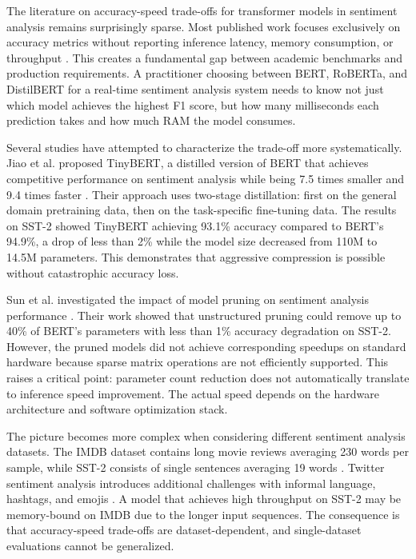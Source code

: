 \documentclass[conference]{IEEEtran}
\begin{document}
The literature on accuracy-speed trade-offs for transformer models in sentiment analysis remains surprisingly sparse. Most published work focuses exclusively on accuracy metrics without reporting inference latency, memory consumption, or throughput \cite{r9}. This creates a fundamental gap between academic benchmarks and production requirements. A practitioner choosing between BERT, RoBERTa, and DistilBERT for a real-time sentiment analysis system needs to know not just which model achieves the highest F1 score, but how many milliseconds each prediction takes and how much RAM the model consumes.

Several studies have attempted to characterize the trade-off more systematically. Jiao et al. proposed TinyBERT, a distilled version of BERT that achieves competitive performance on sentiment analysis while being 7.5 times smaller and 9.4 times faster \cite{r10}. Their approach uses two-stage distillation: first on the general domain pretraining data, then on the task-specific fine-tuning data. The results on SST-2 showed TinyBERT achieving 93.1\% accuracy compared to BERT's 94.9\%, a drop of less than 2\% while the model size decreased from 110M to 14.5M parameters. This demonstrates that aggressive compression is possible without catastrophic accuracy loss.

Sun et al. investigated the impact of model pruning on sentiment analysis performance \cite{r11}. Their work showed that unstructured pruning could remove up to 40\% of BERT's parameters with less than 1\% accuracy degradation on SST-2. However, the pruned models did not achieve corresponding speedups on standard hardware because sparse matrix operations are not efficiently supported. This raises a critical point: parameter count reduction does not automatically translate to inference speed improvement. The actual speed depends on the hardware architecture and software optimization stack.

The picture becomes more complex when considering different sentiment analysis datasets. The IMDB dataset contains long movie reviews averaging 230 words per sample, while SST-2 consists of single sentences averaging 19 words \cite{r12}. Twitter sentiment analysis introduces additional challenges with informal language, hashtags, and emojis \cite{r13}. A model that achieves high throughput on SST-2 may be memory-bound on IMDB due to the longer input sequences. The consequence is that accuracy-speed trade-offs are dataset-dependent, and single-dataset evaluations cannot be generalized.
\end{document}
